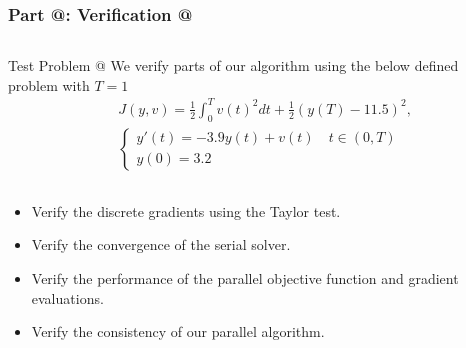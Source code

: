 \documentclass[9pt]{beamer}
\makeatletter
\newcommand*{\rom}[1]{\expandafter\@slowromancap\romannumeral #1@}
\makeatother
\begin{document}
\begin{frame}
\frametitle{\textbf{ Part \rom{4}:} Verification \rom{1}}
\begin{columns}
\begin{block}{Test Problem \rom{1}}
We verify parts of our algorithm using the below defined problem with $T=1$
{\small\begin{align*}
&J(y,v) = \frac{1}{2}\int_0^{T}v(t)^2dt + \frac{1}{2}(y(T)-11.5)^2, \\
&\left\{
     \begin{array}{lr}
       	y'(t)=-3.9y(t) + v(t) \quad t\in(0,T)\\
       	y(0)=3.2
     \end{array}
   \right. 
\end{align*}}
\end{block}
\end{columns}
\begin{itemize}
\item{Verify the discrete gradients using the Taylor test.}
\item{Verify the convergence of the serial solver.}
\item{Verify the performance of the parallel objective function and gradient evaluations.}
\item{Verify the consistency of our parallel algorithm.}
\end{itemize}
\end{frame}
\end{document}
